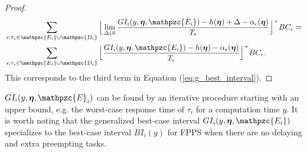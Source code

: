 \begin{proof}
\begin{align*}
	& \sum\limits_{\epsilon:\tau_{\epsilon} \in \mathpzc{E_i} \cup \mathpzc{D_i}} \Big\lfloor \lim \limits_{\Delta \downarrow 0}  \dfrac{GI_i(y, \vec{\eta},  \mathpzc{E_i})-h(\vec{\eta})+\Delta-\alpha_\epsilon(\vec{\eta})}{T_\epsilon}\Big\rfloor^+  BC_\epsilon
	= \\
	& \sum\limits_{\epsilon:\tau_{\epsilon} \in \mathpzc{E_i} \cup \mathpzc{D_i}} \Big\lfloor  \dfrac{GI_i(y, \vec{\eta},  \mathpzc{E_i})-h(\vec{\eta})-\alpha_\epsilon(\vec{\eta})}{T_\epsilon}\Big\rfloor^+  BC_\epsilon.
	\end{align*}
	This corresponds to the third term in Equation (\ref{eq:g_best_interval}).
\end{proof}


$GI_i(y,\vec{\eta},\mathpzc{E}_i)$ can be found by an iterative procedure starting with an upper bound, e.g. the worst-case response time of $\tau_i$ for a computation time $y$. It is worth noting that the generalized best-case interval $GI_i(y, \vec{\eta},\mathpzc{E_i})$ specializes to the best-case interval $BI_i(y)$ for FPPS when there are no delaying and extra preempting tasks. 
\fi

